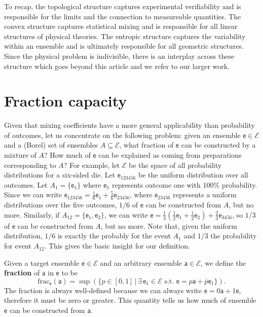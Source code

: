 \documentclass[10pt,twocolumn, nofootinbib]{revtex4-2}
\newcommand\fraction{\mathrm{frac}}
\newcommand{\ens}[1][e] {\mathsf{#1}} %
\newcommand{\Ens}[1][E] {\mathcal{#1}} %
\begin{document}
To recap, the topological structure captures experimental verifiability and is responsible for the limits and the connection to measureable quantities. The convex structure captures statistical mixing and is responsible for all linear structures of physical theories. The entropic structure captures the variability within an ensemble and is ultimately responsible for all geometric structures. Since the physical problem is indivisible, there is an interplay across these structure which goes beyond this article and we refer to our larger work.

\section{Fraction capacity}

Given that mixing coefficients have a more general applicability than probability of outcomes, let us concentrate on the following problem: given an ensemble $\ens \in \Ens$ and a (Borel) set of ensembles $A \subseteq \Ens$, what fraction of $\ens$ can be constructed by a mixture of $A$? How much of $\ens$ can be explained as coming from preparations corresponding to $A$? For example, let $\Ens$ be the space of all probability distributions for a six-sided die. Let $\ens_{123456}$ be the uniform distribution over all outcomes. Let $A_1 = \{\ens_1\}$ where $\ens_1$ represents outcome one with 100\% probability. Since we can write $\ens_{123456} = \frac{1}{6} \ens_{1} + \frac{5}{6} \ens_{23456}$, where $\ens_{23456}$ represents a uniform distributions over the five outcomes, $1/6$ of $\ens$ can be constructed from $A$, but no more. Similarly, if $A_{12} = \{\ens_{1},\ens_{2}\}$, we can write $\ens = \frac{1}{3} \left(\frac{1}{2} \ens_1 + \frac{1}{2} \ens_2 \right)  + \frac{2}{3} \ens_{3456}$, so $1/3$ of $\ens$ can be constructed from $A$, but no more. Note that, given the uniform distribution, $1/6$ is exactly the probably for the event $A_1$ and $1/3$ the probability for event $A_{12}$. This gives the basic insight for our definition.

Given a target ensemble $\ens \in \Ens$ and an arbitrary ensemble $\ens[a] \in \Ens$, we define the \textbf{fraction} of $\ens[a]$ in $\ens$ to be
\begin{equation}
	\fraction_{\ens}(\ens[a]) = \sup(\{ p \in [0,1] \, | \, \exists \, \ens_1 \in \Ens \text{ s.t. }  \ens = p \ens[a] + \bar{p} \ens_1 \}).
\end{equation}
The fraction is always well-defined because we can always write $\ens = 0 \ens[a] + 1 \ens$, therefore it must be zero or greater. This quantity tells us how much of ensemble $\ens$ can be constructed from $\ens[a]$. 
\end{document}
